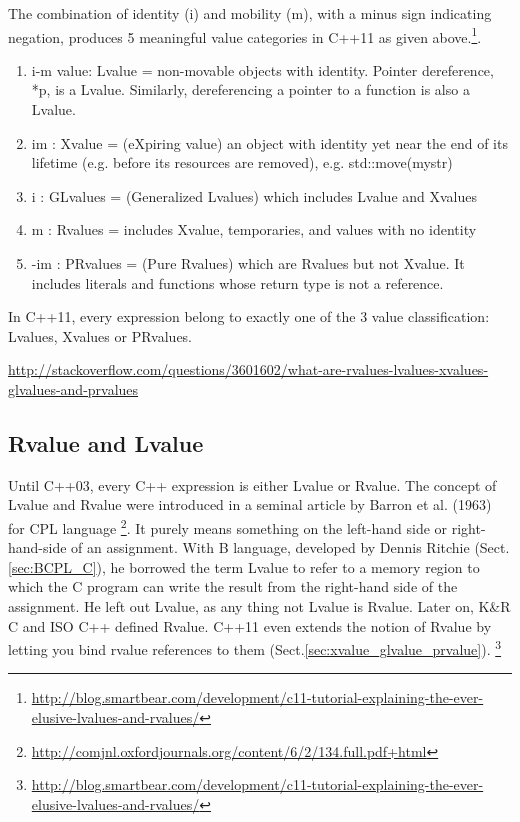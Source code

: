The combination of identity (i) and mobility (m), with a minus sign indicating
negation, produces 5 meaningful value categories in C++11 as given
above.\footnote{\url{http://blog.smartbear.com/development/c11-tutorial-explaining-the-ever-elusive-lvalues-and-rvalues/}}.
\begin{enumerate}
  \item i-m value: Lvalue = non-movable objects with identity. Pointer
  dereference, *p, is a Lvalue. Similarly, dereferencing a pointer to a function
  is also a Lvalue.
  
  \item im : Xvalue = (eXpiring value) an object with identity yet near the end
  of its lifetime (e.g. before its resources are removed), e.g. std::move(mystr)
  
  \item i : GLvalues = (Generalized Lvalues)  which includes Lvalue and Xvalues
  \item m : Rvalues = includes Xvalue, temporaries, and values with no identity
  \item -im : PRvalues = (Pure Rvalues) which are Rvalues but not Xvalue. It
  includes literals and functions whose return type is not a reference.
\end{enumerate}
In C++11, every expression belong to exactly one of the 3 value classification:
Lvalues, Xvalues or PRvalues.


\url{http://stackoverflow.com/questions/3601602/what-are-rvalues-lvalues-xvalues-glvalues-and-prvalues}


\subsection{Rvalue and Lvalue}
\label{sec:rvalue_lvalue}

Until C++03, every C++ expression is either Lvalue or Rvalue. The concept of
Lvalue and Rvalue were introduced in a seminal article by Barron et al. (1963)
for CPL language
\footnote{\url{http://comjnl.oxfordjournals.org/content/6/2/134.full.pdf+html}}.
It purely means something on the left-hand side or right-hand-side of an
assignment. With B language, developed by Dennis Ritchie
(Sect.\ref{sec:BCPL_C}), he borrowed the term Lvalue to refer to a memory region
to which the C program can write the result from the right-hand side of the
assignment. He left out Lvalue, as any thing not Lvalue is Rvalue. Later on,
K\&R C and ISO C++ defined Rvalue. C++11 even extends the notion of Rvalue by
letting you bind rvalue references to them
(Sect.\ref{sec:xvalue_glvalue_prvalue}).
\footnote{\url{http://blog.smartbear.com/development/c11-tutorial-explaining-the-ever-elusive-lvalues-and-rvalues/}}



